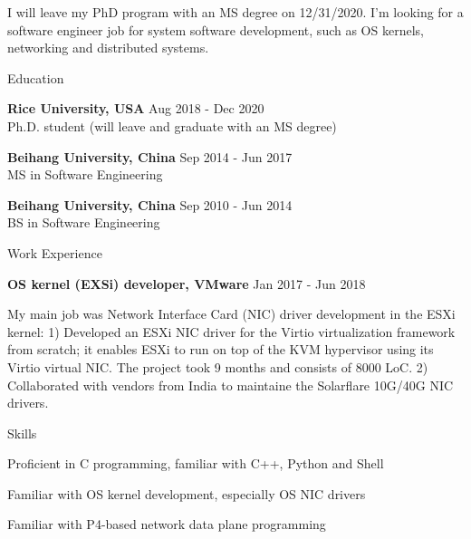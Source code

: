 \documentclass{resume} %
\begin{document}


I will leave my PhD program with an MS degree on 12/31/2020.
I'm looking for a software engineer job for system software development,
such as OS kernels, networking and distributed systems.


\begin{rSection}{Education}

{\bf Rice University, USA} \hfill { Aug 2018 - Dec 2020}
\\ Ph.D. student (will leave and graduate with an MS degree)

{\bf Beihang University, China} \hfill { Sep 2014 - Jun 2017}
\\ MS in Software Engineering

{\bf Beihang University, China} \hfill { Sep 2010 - Jun 2014}
\\ BS in Software Engineering

\end{rSection}



\begin{rSection}{Work Experience}

\item {\bf OS kernel (EXSi) developer, VMware} \hfill { Jan 2017 - Jun 2018}

My main job was Network Interface Card (NIC) driver development in the
ESXi kernel:
1) Developed an ESXi NIC driver for the Virtio virtualization framework from
scratch; it enables ESXi to run on top of the KVM hypervisor using its Virtio virtual
NIC. The project took 9 months and consists of 8000 LoC.
2) Collaborated with vendors from India to maintaine the Solarflare 10G/40G NIC drivers.


\end{rSection}



\begin{rSection}{Skills} \itemsep -3pt

\item Proficient in C programming, familiar with C++, Python and Shell
\item Familiar with OS kernel development, especially OS NIC drivers
\item Familiar with P4-based network data plane programming

\end{rSection}
\end{document}
